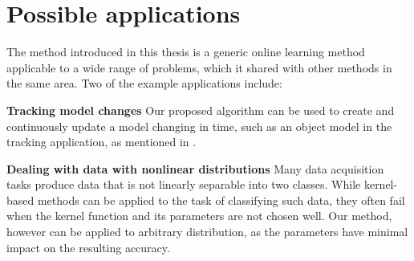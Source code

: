 \section{Possible applications}

The method introduced in this thesis is a generic online learning method applicable to a wide range of problems, which it shared with other methods in the same area.  Two of the example applications include:

{\bf Tracking model changes}
Our proposed algorithm can be used to create and continuously update a model changing in time, such as an object model in the tracking application, as mentioned in \cite{grabner2006}.

{\bf Dealing with data with nonlinear distributions}
Many data acquisition tasks produce data that is not linearly separable into two classes. While kernel-based methods can be applied to the task of classifying such data, they often fail when the kernel  function and its parameters are not chosen well. Our method, however can be applied to arbitrary distribution, as the parameters have minimal impact on the resulting accuracy. 

















